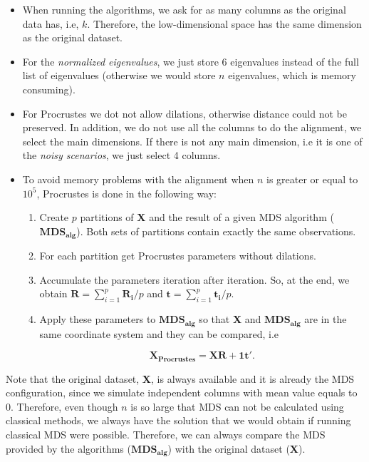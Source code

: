 \documentclass[11pt]{report}
\begin{document}
\begin{itemize}

\item When running the algorithms, we ask for as many columns as the original 
data has, i.e, $k$. Therefore, the low-dimensional space has the same 
dimension as the original dataset.

\item For the \textit{normalized eigenvalues}, we just store 6 eigenvalues 
instead of the full list of eigenvalues (otherwise we would store $n$ 
eigenvalues, which is memory consuming). 

\item For Procrustes we dot not allow dilations, otherwise distance could not
be preserved. In addition, we do not use all the columns 
to do the alignment, we select the main dimensions. If there is not any
main dimension, i.e it is one of the \textit{noisy scenarios}, we just select 4 
columns. 

\item To avoid memory problems with the alignment when $n$ is greater or 
equal to $10^5$, Procrustes is done in the following way:

\begin{enumerate}

\item Create $p$ partitions of \textbf{X} and the result of a given MDS 
algorithm ($\mathbf{MDS_{alg}}$). Both sets of partitions contain exactly the
same observations.


\item For each partition get Procrustes parameters without dilations.

\item Accumulate the parameters iteration after iteration. So, at the end, 
we obtain $\mathbf{R} = \sum_{i = 1}^p \mathbf{R_i}/p$ and 
$\mathbf{t} = \sum_{i = 1}^p \mathbf{t_i}/p$.

\item Apply these parameters to $\mathbf{MDS_{alg}}$ so that 
\textbf{X} and $\mathbf{MDS_{alg}}$ are in the same coordinate system and
they can be compared, i.e

\[
\mathbf{X_{Procrustes}} = \mathbf{X} \mathbf{R} + \mathbf{1t'}.
\]


\end{enumerate}
\end{itemize}


\indent Note that the original dataset, \textbf{X}, is always available and
it is already the MDS configuration, since we simulate independent columns with
mean value equals to 0. Therefore, even though $n$ is so large that MDS can 
not be calculated using classical methods, we always have the solution that 
we would obtain if running classical MDS were possible. Therefore, we can 
always compare the MDS provided by the algorithms ($\mathbf{MDS_{alg}}$) 
with the original dataset (\textbf{X}).
\end{document}
